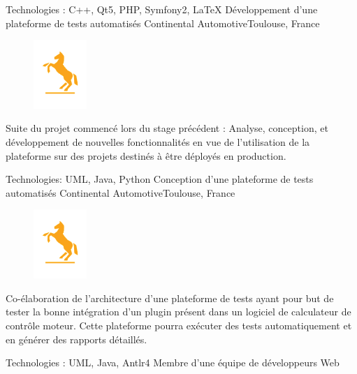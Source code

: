 \documentclass{my_cv_bis}
\begin{document}
	{
	Technologies : C++, Qt5, PHP, Symfony2, \LaTeX{}
	\vspace{15px}
	}
	\vspace{15px}
	{Développement d'une plateforme de tests automatisés}
	{Continental Automotive}{Toulouse, France}
	{
	\begin{minipage}{0.85\textwidth}
	\begin{figure}
		\vspace{-1cm}
		\includegraphics[width=2cm]{images/logos/continental.png}
	\end{figure}	
	Suite du projet commencé lors du stage précédent : Analyse, conception, et développement de nouvelles fonctionnalités en vue de l'utilisation
	de la plateforme sur des projets destinés à être déployés en production. 
	\end{minipage}
	}
	{Technologies: UML, Java, Python}
	\vspace{15px}
	{Conception d'une plateforme de tests automatisés}
	{Continental Automotive}{Toulouse, France}
	{
	\begin{minipage}{0.85\textwidth}
	\begin{figure}
		\vspace{-1cm}
		\includegraphics[width=2cm]{images/logos/continental.png}
	\end{figure}	
	Co-élaboration de l'architecture d'une plateforme de tests ayant pour but de tester la bonne intégration d'un plugin présent dans un logiciel de calculateur de contrôle moteur. Cette plateforme pourra exécuter des tests automatiquement et en générer des rapports détaillés.
	\end{minipage}
	}
	{
	Technologies : UML, Java, Antlr4
	}
	\vspace{15px}
	{Membre d'une équipe de développeurs Web}
\end{document}
